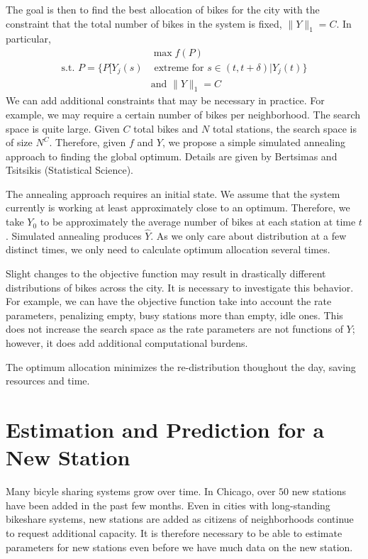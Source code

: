 \documentclass{acm_proc_article-sp}
\begin{document}
The goal is then to find the best allocation of bikes for the city with the constraint that the total number of bikes in the system is fixed, $\| Y\|_1 = C$.  In particular,
\begin{align*}
&\max f (P) \\
\text{s.t. } P = \{ P[ Y_j(s) &\text{ extreme for } s \in (t,t+\delta) | Y_j (t) \} \\
&\text{and } \| Y \|_1 = C
\end{align*}
We can add additional constraints that may be necessary in practice.  For example, we may require a certain number of bikes per neighborhood.  The search space is quite large.  Given $C$ total bikes and $N$ total stations, the search space is of size $N^C$.  Therefore, given $f$ and $Y$, we propose a simple simulated annealing approach to finding the global optimum.  Details are given by Bertsimas and Tsitsikis (Statistical Science).

The annealing approach requires an initial state.  We assume that the system currently is working at least approximately close to an optimum.  Therefore, we take $Y_0$ to be approximately the average number of bikes at each station at time $t$.  Simulated annealing produces $\hat{Y}$.  As we only care about distribution at a few distinct times, we only need to calculate optimum allocation several times. 

Slight changes to the objective function may result in drastically different distributions of bikes across the city.  It is necessary to investigate this behavior.  For example, we can have the objective function take into account the rate parameters, penalizing empty, busy stations more than empty, idle ones.  This does not increase the search space as the rate parameters are not functions of $Y$; however, it does add additional computational burdens. 

The optimum allocation minimizes the re-distribution thoughout the day, saving resources and time.


\section{Estimation and Prediction for a New Station} \label{newstation}

Many bicyle sharing systems grow over time.  In Chicago, over $50$ new stations have been added in the past few months.  Even in cities with long-standing bikeshare systems, new stations are added as citizens of neighborhoods continue to request additional capacity.  It is therefore necessary to be able to estimate parameters for new stations even before we have much data on the new station.
\end{document}
